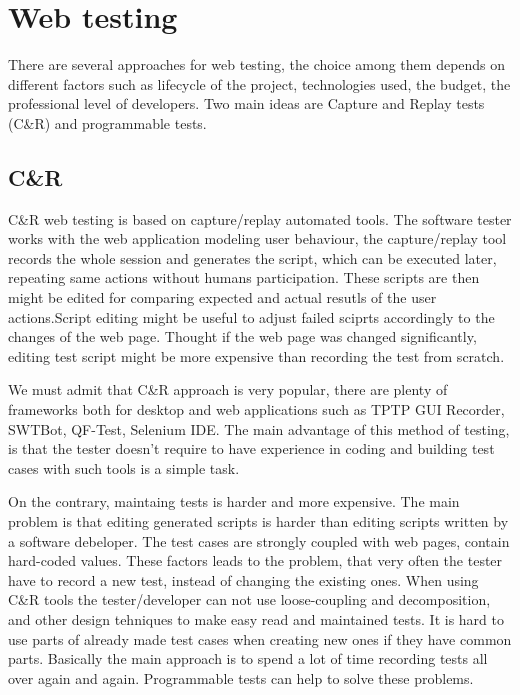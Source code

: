 	\chapter{Web testing}
	\label{ch:webtesting}

		There are several approaches for web testing, the choice among them depends on
		different factors such as lifecycle of the project, technologies used, the
		budget, the professional level of developers. Two main ideas are Capture and
		Replay tests (C\&R) and programmable tests.
		
		\section{C\&R}
			C\&R web testing is based on capture/replay automated
			tools. \cite{CaptureReplay7} The software tester works with the web
			application modeling user behaviour, the capture/replay tool records the
			whole session and generates the script, which can be executed later,
			repeating same actions without humans participation. These scripts are then
			might be edited for comparing expected and actual resutls of the user
			actions.Script editing might be useful to adjust failed sciprts accordingly
			to the changes of the web page. Thought if the web page was changed
			significantly, editing test script might be more expensive than recording the
			test from scratch. 
			
			We must admit that C\&R approach is very popular, there are plenty of
			frameworks both for desktop and web applications such as TPTP GUI Recorder, SWTBot, QF-Test,
			Selenium IDE.
			The main advantage of this method of testing, is that the tester doesn't
			require to have experience in coding and building test cases with such tools is a simple task. 
			
			On the contrary, maintaing tests is harder and more expensive.
			The main problem is that editing generated scripts is harder than editing
			scripts written by a software debeloper. The test cases are strongly coupled
			with web pages, contain hard-coded values. These factors leads to the
			problem, that very often the tester have to record a new test, instead of
			changing the existing ones. When using C\&R tools the tester/developer can
			not use loose-coupling and decomposition, and other design tehniques to make
			easy read and maintained tests. It is hard to use parts of already made test
			cases when creating new ones if they have common parts. Basically the main
			approach is to spend a lot of time recording tests all over again and again.
			Programmable tests can help to solve these problems.
			
